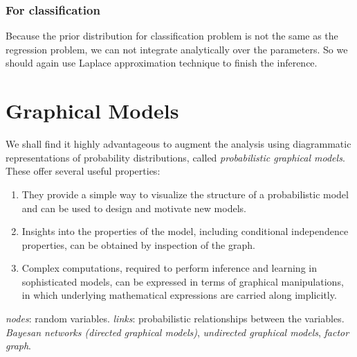 \documentclass[a4paper]{book}
\begin{document}
\subsubsection{For classification}
Because the prior distribution for classification problem is not the same as the regression problem, we can not integrate analytically  over the parameters.  So we should again use Laplace approximation technique to finish the inference.


\section{Graphical Models}
We shall find it highly advantageous to augment the analysis using diagrammatic representations of probability distributions, called \textit{probabilistic graphical models}. These offer several useful properties:
\begin{enumerate}
    \item They provide a simple way to visualize the structure of a probabilistic model and can be used to design and motivate new models.
    \item Insights into the properties of the model, including conditional independence properties, can be obtained by inspection of the graph.
    \item Complex computations, required to perform inference and learning in sophisticated models, can be expressed in terms of graphical manipulations, in which underlying mathematical expressions are carried along implicitly.
\end{enumerate}
\textit{nodes}: random variables. \textit{links}: probabilistic relationships between the variables.
\newline
\textit{Bayesan networks (directed graphical models)}, \textit{undirected graphical models}, \textit{factor graph}.
\end{document}
